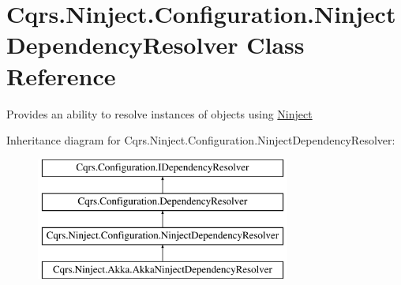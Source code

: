 \hypertarget{classCqrs_1_1Ninject_1_1Configuration_1_1NinjectDependencyResolver}{}\section{Cqrs.\+Ninject.\+Configuration.\+Ninject\+Dependency\+Resolver Class Reference}
\label{classCqrs_1_1Ninject_1_1Configuration_1_1NinjectDependencyResolver}


Provides an ability to resolve instances of objects using \hyperlink{namespaceCqrs_1_1Ninject}{Ninject}  


Inheritance diagram for Cqrs.\+Ninject.\+Configuration.\+Ninject\+Dependency\+Resolver\+:\begin{figure}[H]
\begin{center}
\leavevmode
\includegraphics[height=4.000000cm]{classCqrs_1_1Ninject_1_1Configuration_1_1NinjectDependencyResolver}
\end{center}
\end{figure}
